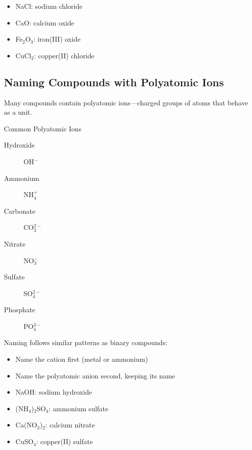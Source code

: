 \begin{example}
\begin{itemize}
    \item NaCl: sodium chloride
    \item CaO: calcium oxide
    \item Fe$_2$O$_3$: iron(III) oxide
    \item CuCl$_2$: copper(II) chloride
\end{itemize}
\end{example}

\subsection{Naming Compounds with Polyatomic Ions}

Many compounds contain polyatomic ions—charged groups of atoms that behave as a unit.

\begin{keyconcept}{Common Polyatomic Ions}
\begin{description}
    \item[Hydroxide] OH$^-$ 
    \item[Ammonium] NH$_4^+$
    \item[Carbonate] CO$_3^{2-}$
    \item[Nitrate] NO$_3^-$
    \item[Sulfate] SO$_4^{2-}$
    \item[Phosphate] PO$_4^{3-}$
\end{description}
\end{keyconcept}

Naming follows similar patterns as binary compounds:
\begin{itemize}
    \item Name the cation first (metal or ammonium)
    \item Name the polyatomic anion second, keeping its name
\end{itemize}

\begin{example}
\begin{itemize}
    \item NaOH: sodium hydroxide
    \item (NH$_4$)$_2$SO$_4$: ammonium sulfate
    \item Ca(NO$_3$)$_2$: calcium nitrate
    \item CuSO$_4$: copper(II) sulfate
\end{itemize}
\end{example}

